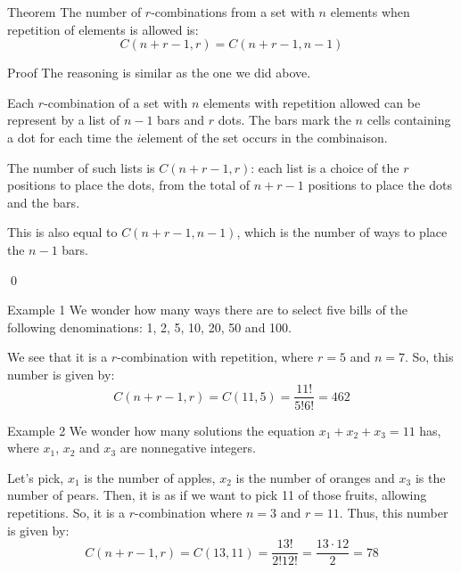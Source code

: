 \documentclass[a4paper]{article}
\begin{document}
\begin{parag}{Theorem}
    The number of $r$-combinations from a set with $n$ elements when repetition of elements is allowed is: 
    \[C\left(n + r - 1, r\right) = C\left(n + r - 1, n - 1\right)\]

    \begin{subparag}{Proof}
        The reasoning is similar as the one we did above. 

        Each $r$-combination of a set with $n$ elements with repetition allowed can be represent by a list of $n-1$ bars and $r$ dots. The bars mark the $n$ cells containing a dot for each time the $i$\Th element of the set occurs in the combinaison.

        The number of such lists is $C\left(n+r-1, r\right)$: each list is a choice of the $r$ positions to place the dots, from the total of $n + r - 1$ positions to place the dots and the bars.

        This is also equal to $C\left(n + r - 1, n - 1\right)$, which is the number of ways to place the $n-1$ bars.

        \qed
    \end{subparag}
\end{parag}

\begin{parag}{Example 1}
    We wonder how many ways there are to select five bills of the following denominations: 1, 2, 5, 10, 20, 50 and 100. 

    We see that it is a $r$-combination with repetition, where $r = 5$ and $n = 7$. So, this number is given by: 
    \[C\left(n + r - 1, r\right) = C\left(11, 5\right) = \frac{11!}{5!6!} = 462\]
    
\end{parag}


\begin{parag}{Example 2}
    We wonder how many solutions the equation $x_1 + x_2 + x_3 = 11$ has, where $x_1$, $x_2$ and $x_3$ are nonnegative integers.

    Let's pick, $x_1$ is the number of apples, $x_2$ is the number of oranges and $x_3$ is the number of pears. Then, it is as if we want to pick 11 of those fruits, allowing repetitions. So, it is a $r$-combination where $n = 3$ and $r = 11$. Thus, this number is given by:
    \[C\left(n+r-1, r\right) = C\left(13, 11\right) = \frac{13!}{2!12!} = \frac{13\cdot 12}{2} = 78\]
\end{parag}
\end{document}
